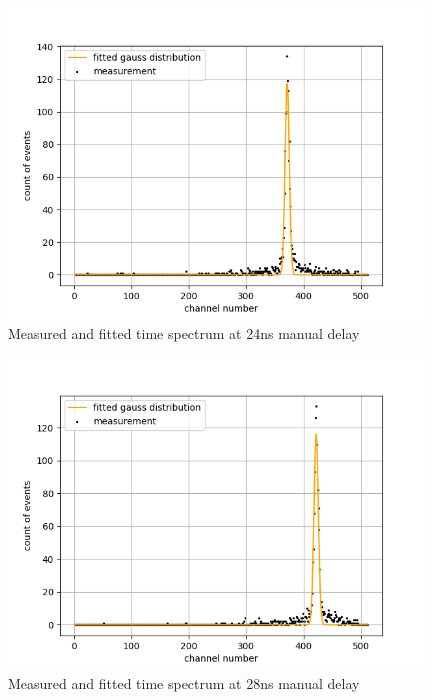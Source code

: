 \begin{figure}[H]
    \centering
    \includegraphics[width=110mm,scale=0.5]{Positronium/include/timecalibration6.png}
    \caption{Measured and fitted time spectrum at 24ns manual delay} 
   
\end{figure}

\begin{figure}[H]
    \centering
    \includegraphics[width=110mm,scale=0.5]{Positronium/include/timecalibration7.png}
    \caption{Measured and fitted time spectrum at 28ns manual delay} 
   
\end{figure}

